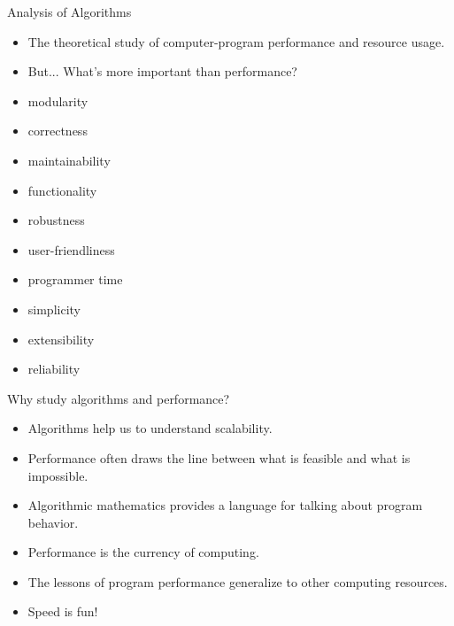 \documentclass{beamer}
\begin{document}
\begin{frame}{Analysis of Algorithms}
    \begin{itemize}
        \item The theoretical study of computer-program performance and resource usage. 
        \item But... What’s more important than performance?
    \end{itemize}
    \vspace{5mm}
    \begin{minipage}{0.49\textwidth}
        \begin{itemize}
        \item modularity
        \item correctness
        \item maintainability
        \item functionality
        \item robustness
        \end{itemize}
    \end{minipage}
    \begin{minipage}{0.49\textwidth}
        \begin{itemize}
            \item user-friendliness
            \item programmer time
            \item simplicity
            \item extensibility
            \item reliability
        \end{itemize}
    \end{minipage}
\end{frame}

\begin{frame}{Why study algorithms and performance?}
    \begin{itemize}
        \item Algorithms help us to understand scalability.
        \item Performance often draws the line between what is feasible and what is impossible.
        \item Algorithmic mathematics provides a language for talking about program behavior.
        \item Performance is the currency of computing.
        \item The lessons of program performance generalize to other computing resources.
        \item Speed is fun!
    \end{itemize}
\end{frame}
\end{document}
